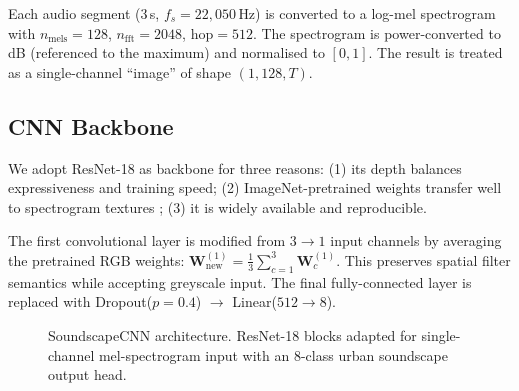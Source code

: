 \documentclass[10pt,twocolumn]{article}
\begin{document}
Each audio segment (3\,s, \( f_s = 22{,}050\,\)Hz) is converted to a
log-mel spectrogram with $n_\mathrm{mels}=128$, $n_\mathrm{fft}=2048$,
$\mathrm{hop}=512$. The spectrogram is power-converted to dB
(referenced to the maximum) and normalised to $[0,1]$.  The result is treated
as a single-channel ``image'' of shape $(1, 128, T)$.

\subsection{CNN Backbone}

We adopt ResNet-18 \cite{he2016} as backbone for three reasons:
(1) its depth balances expressiveness and training speed;
(2) ImageNet-pretrained weights transfer well to spectrogram textures
\cite{palanisamy2020};
(3) it is widely available and reproducible.

The first convolutional layer is modified from $3 \to 1$ input channels
by averaging the pretrained RGB weights:
$\mathbf{W}^{(1)}_\text{new} = \frac{1}{3}\sum_{c=1}^{3}\mathbf{W}^{(1)}_c$.
This preserves spatial filter semantics while accepting greyscale input.
The final fully-connected layer is replaced with
Dropout($p{=}0.4$) $\to$ Linear($512 \to 8$).

\begin{figure}[h]
\centering
{}
\caption{SoundscapeCNN architecture. ResNet-18 blocks adapted for
         single-channel mel-spectrogram input with an 8-class urban
         soundscape output head.}
\label{fig:arch}
\end{figure}
\end{document}
